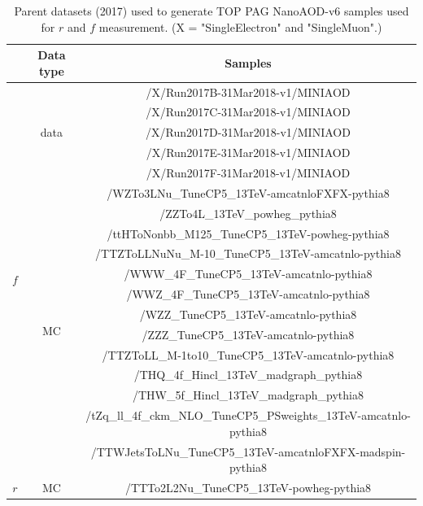 \begin{table}[htbp]
 \begin{center}
 \caption{Parent datasets (2017) used to generate TOP PAG NanoAOD-v6 samples used for $r$ and $f$ measurement. (\small{X = "SingleElectron" and "SingleMuon".)
 }}
 \label{tab:2017_RandF_Samples}
 \begin{tabular}{c|c|c}
  \hline
  & Data type & Samples  \\  
  \hline\hline
  \multirow{18}{*}{$f$} & \multirow{5}{*}{data} &
  /X/Run2017B-31Mar2018-v1/MINIAOD \\
  & &/X/Run2017C-31Mar2018-v1/MINIAOD \\
  & & /X/Run2017D-31Mar2018-v1/MINIAOD \\
  & &/X/Run2017E-31Mar2018-v1/MINIAOD \\
  & &/X/Run2017F-31Mar2018-v1/MINIAOD \\ \cline{2-3}
  & \multirow{13}{*}{MC} &
  /WZTo3LNu\_TuneCP5\_13TeV-amcatnloFXFX-pythia8 \\
  & & /ZZTo4L\_13TeV\_powheg\_pythia8 \\
  & & /ttHToNonbb\_M125\_TuneCP5\_13TeV-powheg-pythia8\\
  & & /TTZToLLNuNu\_M-10\_TuneCP5\_13TeV-amcatnlo-pythia8 \\
  & & /WWW\_4F\_TuneCP5\_13TeV-amcatnlo-pythia8 \\
  & & /WWZ\_4F\_TuneCP5\_13TeV-amcatnlo-pythia8 \\
  & & /WZZ\_TuneCP5\_13TeV-amcatnlo-pythia8 \\
  & & /ZZZ\_TuneCP5\_13TeV-amcatnlo-pythia8 \\ 
  & &/TTZToLL\_M-1to10\_TuneCP5\_13TeV-amcatnlo-pythia8 \\
  & & /THQ\_4f\_Hincl\_13TeV\_madgraph\_pythia8 \\
  & & /THW\_5f\_Hincl\_13TeV\_madgraph\_pythia8 \\
  & & /tZq\_ll\_4f\_ckm\_NLO\_TuneCP5\_PSweights\_13TeV-amcatnlo-pythia8 \\
  & & /TTWJetsToLNu\_TuneCP5\_13TeV-amcatnloFXFX-madspin-pythia8 \\ \hline
  $r$ & MC& /TTTo2L2Nu\_TuneCP5\_13TeV-powheg-pythia8 \\ \hline
 \end{tabular}
 \end{center}
\end{table}

